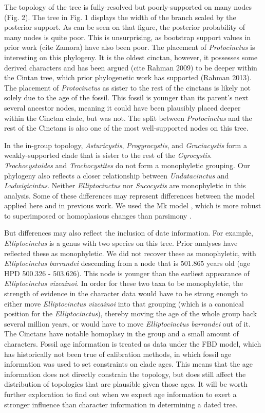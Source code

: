 \documentclass{article}
\begin{document}
The topology of the tree is fully-resolved but poorly-supported on many nodes (Fig. 2).
The tree in Fig. 1 displays the width of the branch scaled by the posterior support.
As can be seen on that figure, the posterior probability of many nodes is quite poor. 
This is unsurprising, as bootstrap support values in prior work (cite Zamora) have also been poor.
The placement of \textit{Protocinctus} is interesting on this phylogeny. 
It is the oldest cinctan, however, it possesses some derived characters and has been argued (cite Rahman 2009) to be deeper within the Cintan tree, which prior phylogenetic work has supported (Rahman 2013). 
The placement of \textit{Protocinctus} as sister to the rest of the cinctans is likely not solely due to the age of the fossil. This fossil is younger than its parent's next several ancestor nodes, meaning it could have been plausibly placed deeper within the Cinctan clade, but was not. 
The split between \textit{Protocinctus} and the rest of the Cinctans is also one of the most well-supported nodes on this tree.

In the in-group topology, \textit{Asturicystis}, \textit{Progyrocystis}, and \textit{Graciacystis} form a weakly-supported clade that is sister to the rest of the \textit{Gyrocystis}.
\textit{Trochocystoides} and \textit{Trochocystites} do not form a monophyletic grouping. 
Our phylogeny also reflects a closer relationship between \textit{Undatacinctus} and \textit{Ludwigicintus}. 
Neither \textit{Elliptocinctus} nor \textit{Sucocystis} are monophyletic in this analysis.
Some of these differences may represent differences between the model applied here and in previous work.
We used the Mk model \citep{Lewis2001}, which is more robust to superimposed or homoplasious changes than parsimony \citep{Felsenstein1978, Wright2014}.

But differences may also reflect the inclusion of date information.
For example, \textit{Elliptocinctus} is a genus with two species on this tree. 
Prior analyses have reflected these as monophyletic.
We did not recover these as monophyletic, with \textit{Elliptocinctus barrandei} descending from a node that is 501.865 years old (age HPD 500.326 - 503.626).
This node is younger than the earliest appearance of \textit{Elliptocinctus vizcainoi}.
In order for these two taxa to be monophyletic, the strength of evidence in the character data would have to be strong enough to either move \textit{Elliptocinctus vizcainoi} into that grouping (which is a canonical position for the \textit{Elliptocinctus}), thereby moving the age of the whole group back several million years, or would have to move \textit{Elliptocinctus barrandei} out of it.
The Cinctans have notable homoplasy in the group and a small amount of characters.
Fossil age information is treated as data under the FBD model, which has historically not been true of calibration methods, in which fossil age information was used to set constraints on clade ages.
This means that the age information does not directly constrain the topology, but does still affect the distribution of topologies that are plausible given those ages. 
It will be worth further exploration to find out when we expect age information to exert a stronger influence than character information in determining a dated tree.
\end{document}
